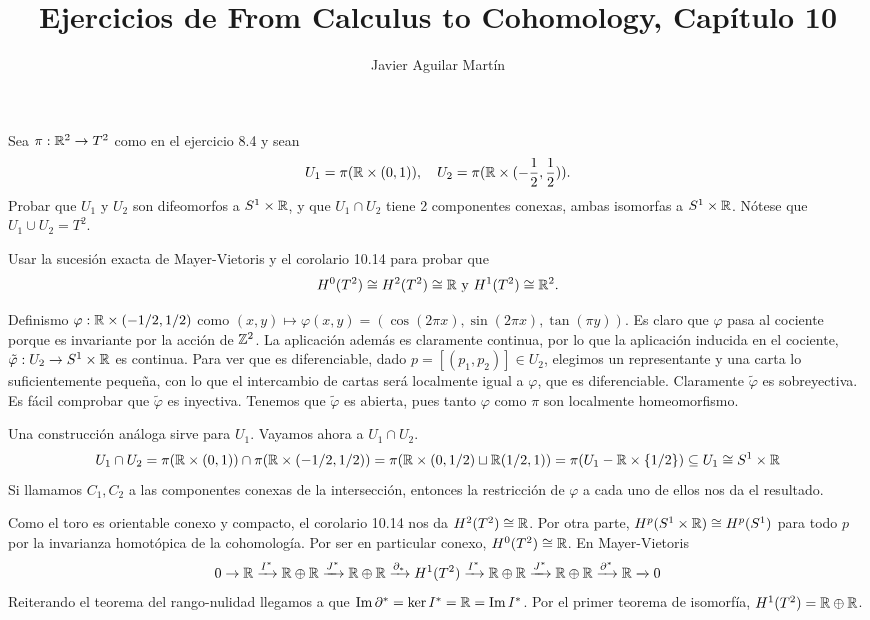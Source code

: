 \documentclass[twoside]{article}
\begin{document}
\title{Ejercicios de From Calculus to Cohomology, Capítulo 10}
\author{Javier Aguilar Martín}
\maketitle

\begin{ejercicio}{10.1}
Sea $\pi:\mathbb{R}^2\to T^2$ como en el ejercicio 8.4 y sean
\[
U_1=\pi(\mathbb{R}\times (0,1)),\quad U_2=\pi(\mathbb{R}\times (-\frac{1}{2},\frac{1}{2})).
\]
Probar que $U_1$ y $U_2$ son difeomorfos a $S^1\times\mathbb{R}$, y que $U_1\cap U_2$ tiene 2 componentes conexas, ambas isomorfas a $S^1\times\mathbb{R}$. Nótese que $U_1\cup U_2=T^2$.

Usar la sucesión exacta de Mayer-Vietoris y el corolario 10.14 para probar que
\[
H^0(T^2)\cong H^2(T^2)\cong\mathbb{R}\text{ y }H^1(T^2)\cong\mathbb{R}^2.
\]
\end{ejercicio}
\begin{solucion}
Definismo $\varphi: \mathbb{R}\times(-1/2,1/2)$ como $(x,y)\mapsto\varphi(x,y)=(\cos(2\pi x), \sin(2\pi x), \tan(\pi y))$. Es claro que $\varphi$ pasa al cociente porque es invariante por la acción de $\mathbb{Z}^2$. La aplicación además es claramente continua, por lo que la aplicación inducida en el cociente, $\tilde{\varphi}: U_2\to S^1\times\mathbb{R}$ es continua. Para ver que es diferenciable, dado $p=[(p_1,p_2)]\in U_2$, elegimos un representante y una carta lo suficientemente pequeña, con lo que el intercambio de cartas será localmente igual a $\varphi$, que es diferenciable. Claramente $\tilde{\varphi}$ es sobreyectiva. Es fácil comprobar que $\tilde{\varphi}$ es inyectiva. Tenemos que $\tilde{\varphi}$ es abierta, pues tanto $\varphi$ como $\pi$ son localmente homeomorfismo. 

Una construcción análoga sirve para $U_1$. Vayamos ahora a $U_1\cap U_2$. 
\[
U_1\cap U_2=\pi(\mathbb{R}\times (0,1))\cap \pi(\mathbb{R}\times (-1/2,1/2))=\pi(\mathbb{R}\times (0,1/2)\sqcup \mathbb{R}(1/2,1))=\pi(U_1-\mathbb{R}\times
 \{1/2\})\subseteq U_1\cong S^1\times\mathbb{R}
\]
Si llamamos $C_1,C_2$ a las componentes conexas de la intersección, entonces la restricción de $\varphi$ a cada uno de ellos nos da el resultado. 


Como el toro es orientable conexo y compacto, el corolario 10.14 nos da $H^2(T^2)\cong\mathbb{R}$. Por otra parte, $H^p(S^1\times\mathbb{R})\cong H^p(S^1)$ para todo $p$ por la invarianza homotópica de la cohomología. Por ser en particular conexo, $H^0(T^2)\cong\mathbb{R}$. En Mayer-Vietoris
\[
0\to\mathbb{R}\xrightarrow{I^*}\mathbb{R}\oplus\mathbb{R}\xrightarrow{J^*}\mathbb{R}\oplus\mathbb{R}\xrightarrow{\partial_*}H^1(T^2)\xrightarrow{I^*}\mathbb{R}\oplus\mathbb{R}\xrightarrow{J^*}\mathbb{R}\oplus\mathbb{R}\xrightarrow{\partial^*}\mathbb{R}\xrightarrow{} 0
\]
Reiterando el teorema del rango-nulidad llegamos a que $\operatorname{Im}{\partial^*}=\ker{I^*}=\mathbb{R}=\operatorname{Im}{I^*}$. Por el primer teorema de isomorfía, $H^1(T^2)=\mathbb{R}\oplus\mathbb{R}$. 


\end{solucion}
\newpage
\end{document}

